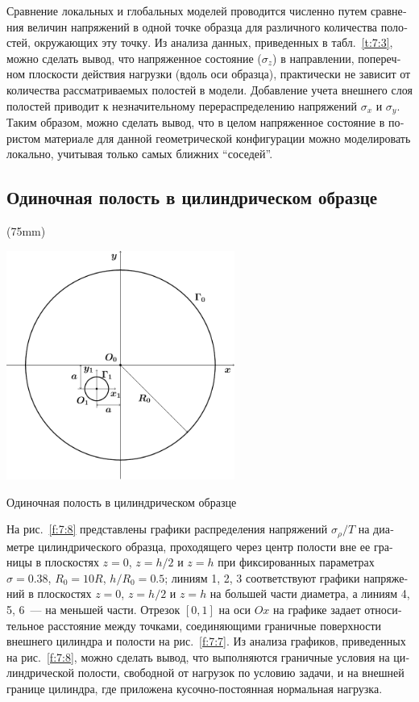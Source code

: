 \begin{russian}
Сравнение локальных и глобальных моделей проводится численно путем сравнения величин напряжений в одной точке образца для различного количества полостей, окружающих эту точку. Из анализа данных, приведенных в табл.~\ref{t:7:3}, можно сделать вывод, что напряженное состояние ($\sigma_z$) в направлении, поперечном плоскости действия нагрузки (вдоль оси образца), практически не зависит от количества рассматриваемых полостей в модели. Добавление учета внешнего слоя полостей приводит к незначительному перераспределению напряжений $\sigma_x$ и $\sigma_y$. Таким образом, можно сделать вывод, что в целом напряженное состояние в пористом материале для данной геометрической конфигурации можно моделировать локально, учитывая только самых ближних ``соседей''.

\subsection{Одиночная полость в цилиндрическом образце}

\sidefig(75mm){
\includegraphics[width=7.5cm]{cav1.pdf}
\caption{\centering Одиночная полость в цилиндрическом образце}
\label{f:7:7}
}{На рис.~\ref{f:7:8} представлены графики распределения напряжений $\sigma_\rho/T$ на диаметре цилиндрического образца, проходящего через центр полости вне ее границы в плоскостях $z=0$, $z=h/2$ и $z=h$ при фиксированных параметрах $\sigma=0.38$, $R_0=10R$, $h/R_0=0.5$; линиям 1, 2, 3 соответствуют графики напряжений в плоскостях $z=0$, $z=h/2$ и $z=h$ на большей части диаметра, а линиям 4, 5, 6~--- на меньшей части. Отрезок $[0,1]$ на оси $Ox$ на графике задает относительное расстояние между точками, соединяющими граничные поверхности внешнего цилиндра и полости на рис.~\ref{f:7:7}. Из анализа графиков, приведенных на рис.~\ref{f:7:8}, можно сделать вывод,} что выполняются граничные условия на цилиндрической полости, свободной от нагрузок по условию задачи, и на внешней границе цилиндра, где приложена кусочно-постоянная нормальная нагрузка.


\end{russian}
